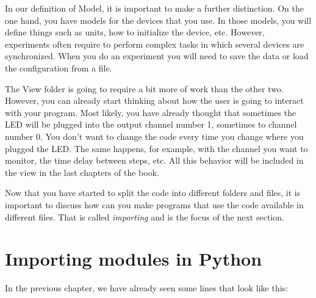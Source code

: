 
In our definition of Model, it is important to make a further distinction. On the one hand, you have models for the devices that you use. In those models, you will define things such as units, how to initialize the device, etc. However, experiments often require to perform complex tasks in which several devices are synchronized. When you do an experiment you will need to save the data or load the configuration from a file. 


The View folder is going to require a bit more of work than the other two. However, you can already start thinking about how the user is going
to interact with your program. Most likely, you have already thought that sometimes the {LED} will be plugged into the output channel number 1,
sometimes to channel number 0. You don't want to change the code every time you change where you plugged the LED. The same happens, for example, with the channel you want to monitor, the time delay between steps, etc. All this behavior will be included in the view in the last chapters of the book. 

Now that you have started to split the code into different folders and files, it is important to discuss how can you make programs that use the code available in different files. That is called \emph{importing} and is the focus of the next section. 

\section{Importing modules in Python}
In the previous chapter, we have already seen some lines that look like this:

